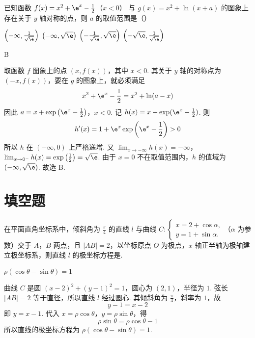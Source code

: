 \begin{problem}
已知函数 \( f(x) = x^2 + \e^x - \frac{1}{2} \)（\(x < 0\)） 与 \( g(x) = x^2 + \ln\left(x + a\right) \) 的图象上存在关于 \( y \) 轴对称的点，则 \( a \) 的取值范围是（\quad）

\choices
    {\(\left(-\infty, \frac{1}{\sqrt{\e}}\right)\)}
    {\(\left(-\infty, \sqrt{\e}\right)\)}
    {\(\left(-\frac{1}{\sqrt{\e}}, \sqrt{\e}\right)\)}
    {\(\left(-\sqrt{\e}, \frac{1}{\sqrt{\e}}\right)\)}
\begin{answer}
B
\end{answer}

\begin{solution}
取函数 \(f\) 图象上的点 \((x,f(x))\)，其中 \(x<0\). 其关于 \(y\) 轴的对称点为 \((-x,f(x))\)，要在 \(g\) 的图象上，就必须满足
\[
x^2+\e^x-\frac12=x^2+\ln(a-x)
\]
因此
\(a=x+\exp\left(\e^x-\frac12\right)\)，\(x<0\).
记 \(h(x)=x+\exp(\e^x-\frac12)\). 则
\[
h'(x)=1+\e^x\exp\left(\e^x-\frac12\right)>0
\]
所以 \(h\) 在 \((-\infty,0)\) 上严格递增. 又
\(\lim_{x\to-\infty}h(x)=-\infty\)，\(\lim_{x\to0^-}h(x)=\exp\left(\frac12\right)=\sqrt{\e}\).
由于 \(x=0\) 不在取值范围内，\(h\) 的值域为 \((-\infty,\sqrt{\e})\). 故选 B.
\end{solution}
\end{problem}

\section{填空题}

\begin{problem}
在平面直角坐标系中，倾斜角为 \(\frac{\pi}{4}\) 的直线 \(l\) 与曲线 \(C: \begin{cases}
x = 2 + \cos \alpha,\\
y = 1 + \sin \alpha.
\end{cases}\)（\(\alpha\) 为参数）交于 \(A\)，\(B\) 两点，且 \(|AB| = 2\)，以坐标原点 \(O\) 为极点，\(x\) 轴正半轴为极轴建立极坐标系，则直线 \(l\) 的极坐标方程是\fillinblank{}.
\begin{answer}
\(\rho(\cos\theta-\sin\theta)=1\)
\end{answer}

\begin{solution}
曲线 \(C\) 是圆 \((x-2)^2+(y-1)^2=1\)，圆心为 \((2,1)\)，半径为 \(1\). 弦长 \(|AB|=2\) 等于直径，所以直线 \(l\) 经过圆心. 其倾斜角为 \(\frac{\pi}{4}\)，斜率为 \(1\)，故
\[
y-1=x-2
\]
即 \(y=x-1\). 代入 \(x=\rho\cos\theta\)，\(y=\rho\sin\theta\)，得
\[
\rho\sin\theta=\rho\cos\theta-1
\]
所以直线的极坐标方程为 \(\rho(\cos\theta-\sin\theta)=1\).
\end{solution}
\end{problem}


